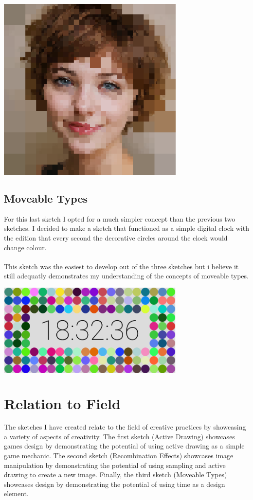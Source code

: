 \documentclass[12pt,a4paper]{article}
\begin{document}
			\begin{center}
				\includegraphics[width=0.7\textwidth]{RAFinal.png}
			\end{center}

		\newpage

		\subsection{Moveable Types}
			For this last sketch I opted for a much simpler concept than the previous two sketches.
			I decided to make a sketch that functioned as a simple digital clock with the edition 
			that every second the decorative circles around the clock would change colour.\\\\This 
			sketch was the easiest to develop out of the three sketches but i believe it still
			adequatly demonstrates my understanding of the concepts of moveable types.

			\begin{center}
				\includegraphics[width=0.7\textwidth]{MTFinal.png}
			\end{center}
	
	\section{Relation to Field}
		The sketches I have created relate to the field of creative practices by showcasing a variety
		of aspects of creativity. The first sketch (Active Drawing) showcases games design by demonstrating
		the potential of using active drawing as a simple game mechanic. The second sketch (Recombination 
		Effects) showcases image manipulation by demonstrating the potential of using sampling and active 
		drawing to create a new image. Finally, the third sketch (Moveable Types) showcases design by 
		demonstrating the potential of using time as a design element.
	
\end{document}
